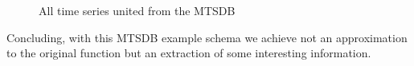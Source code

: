 \begin{figure}[tp]
  \centering
  
  \caption{All time series united from the MTSDB}
  \label{fig:exemple:4mrdtot}
\end{figure}


Concluding, with this MTSDB example schema  we achieve not an
approximation to the original function but an extraction of some
interesting information.





